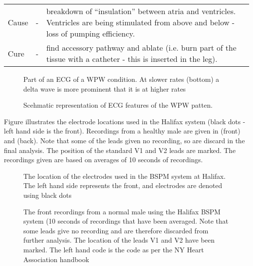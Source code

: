 \begin{tabular}{lcp{13cm}}
Cause & - & breakdown of ``insulation'' between atria and ventricles.  Ventricles
are being stimulated from above and below - loss of pumping efficiency.\\
Cure & - & find accessory pathway and ablate (i.e. burn part of the tissue with a
catheter - this is inserted in the leg).
\end{tabular}

\begin{figure}[htbp] \centering
  \caption[WPW ECG]{Part of an ECG of a WPW condition.  At slower rates
    (bottom) a delta wave is more prominent that it is at higher rates}
  \label{fig:deltawave-ecg}
\end{figure}

 \begin{figure}[htbp] \centering
  \caption[Delta wave]{Scehmatic representation of ECG features of the WPW
    patten.}
  \label{fig:deltawave}
\end{figure}

Figure  illustrates the electrode locations used in
the Halifax system (black dots - left hand side is the front).  Recordings
from a healthy male are given in  (front) and
 (back).  Note that some of the leads given no
recording, so are discard in the final analysis.  The position of the standard
V1 and V2 leads are marked.  The recordings given are based on averages of 10
seconds of recordings.

 \begin{figure}[htbp] \centering
 \caption[Lead location of Halifax BSPM system]{The location of the electrodes
   used in the BSPM system at Halifax.  The left hand side represents the
   front, and electrodes are denoted using black dots}
  \label{fig:halifax-mesh}
\end{figure}

 \begin{figure}[htbp] \centering
 \caption[Normal BSPM recording]{The front recordings from a normal male 
 using the
   Halifax BSPM system (10 seconds of recordings that have been averaged.  Note that some leads give no recording and are
   therefore discarded from further analysis.  The location of the leads V1
   and V2 have been marked.  The left hand code is the code as per the NY
   Heart Association handbook}
  \label{fig:hal-leads-norm-front}
\end{figure}

